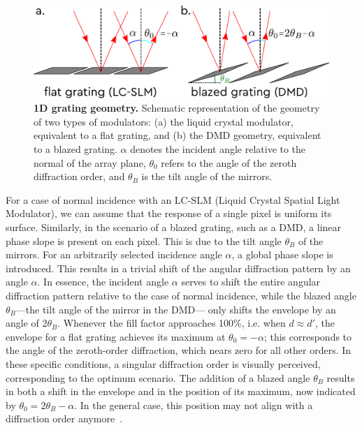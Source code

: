 \documentclass[12pt]{iopart}
\begin{document}
\begin{figure}
  \centering
  \includegraphics[width = \textwidth]{images/grating_geom.pdf}
  \caption{
    \textbf{1D grating geometry.}
    Schematic representation of the geometry of two types of modulators:
    (a) the liquid crystal modulator, equivalent to a flat grating,
    and (b) the DMD geometry, equivalent to a blazed grating.
    $\alpha$ denotes the incident angle relative to the normal of the array plane,
    $\theta_0$ refers to the angle of the zeroth diffraction order,
    and $\theta_B$ is the tilt angle of the mirrors.\\
  }
  \label{fig:grating_geom}
\end{figure}


For a case of normal incidence with an LC-SLM (Liquid Crystal Spatial Light Modulator),
we can assume that the response of a single pixel is uniform its surface.
Similarly, in the scenario of a blazed grating,
such as a DMD, a linear phase slope is present on each pixel.
This is due to the tilt angle $\theta_B$ of the mirrors.
For an arbitrarily selected incidence angle $\alpha$,
a global phase slope is introduced.
This results in a trivial shift of the angular diffraction pattern by an angle $\alpha$.
In essence, the incident angle $\alpha$ serves to shift the entire angular diffraction pattern
relative to the case of normal incidence,
while the blazed angle $\theta_B$—the tilt angle of the mirror in the DMD—
only shifts the envelope by an angle of $2\theta_B$.
Whenever the fill factor approaches 100\%,
i.e. when $d \approx d'$,
the envelope for a flat grating achieves its maximum at $\theta_0 = -\alpha$;
this corresponds to the angle of the zeroth-order diffraction,
which nears zero for all other orders.
In these specific conditions, a singular diffraction order is visually perceived, corresponding to the optimum scenario.
The addition of a blazed angle $\theta_B$ results in both
a shift in the envelope and in the position of its maximum,
now indicated by $\theta_0 = 2\theta_B - \alpha$.
In the general case,
this position may not align with a diffraction order anymore~\cite{Park2015properties}.
\end{document}
